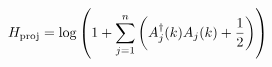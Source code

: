 \begin{equation}
H_{\rm proj}=\log\left(1+\sum_{j=1}^n\left(A^{\dagger}_j(k)A_j(k)+
{1\over 2}\right)\right)
\label{hacheproj}
\end{equation}

